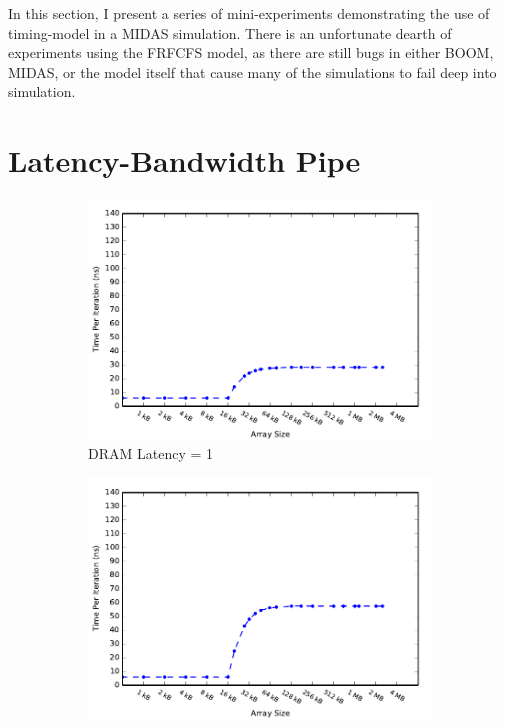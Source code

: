 In this section, I present a series of mini-experiments demonstrating the use
of timing-model in a MIDAS simulation. There is an unfortunate dearth of
experiments using the FRFCFS model, as there are still bugs in either BOOM,
MIDAS, or the model itself that cause many of the simulations to fail deep into
simulation.

\section{Latency-Bandwidth Pipe}

\begin{figure}
\begin{subfigure}[t]{0.33\textwidth}
	\includegraphics[width=\textwidth]{figures/ccbench_lat1.pdf}
	\caption{DRAM Latency = 1}
\end{subfigure}
\begin{subfigure}[t]{0.33\textwidth}
	\includegraphics[width=\textwidth]{figures/ccbench_lat30.pdf}

\end{subfigure}
\end{figure}
